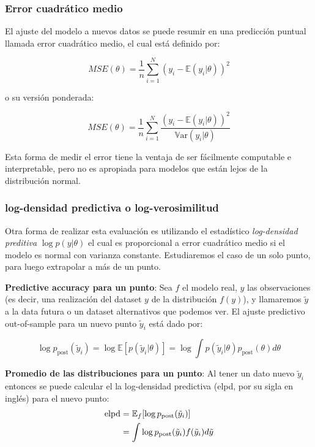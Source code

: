 \subsubsection{Error cuadrático medio}

El ajuste del modelo a nuevos datos se puede resumir en una predicción puntual llamada error cuadrático medio, el cual está definido por:

\begin{equation}
MSE(\theta) = \frac{1}{n}\sum_{i=1}^N (y_i-\mathbb{E}(y_i|\theta))^2
\end{equation}

o su versión ponderada:

\begin{equation}
MSE(\theta) = \frac{1}{n}\sum_{i=1}^N \frac{(y_i-\mathbb{E}(y_i|\theta))^2}{\mathbb{V}\text{ar}(y_i|\theta)}
\end{equation}

Esta forma de medir el error tiene la ventaja de ser fácilmente computable e interpretable, pero no es apropiada para modelos que están lejos de la distribución normal.

\subsubsection{log-densidad predictiva o log-verosimilitud}
Otra forma de realizar esta evaluación es utilizando el estadístico \emph{log-densidad preditiva} $\log p(y|\theta)$ el cual es proporcional a error cuadrático medio si el modelo es normal con varianza constante. Estudiaremos el caso de un solo punto, para luego extrapolar a más de un punto.

\textbf{Predictive accuracy para un punto}: Sea $f$ el modelo real, $y$ las observaciones (es decir, una realización del dataset $y$ de la distribución $f(y)$), y llamaremos $\tilde{y}$ a la data futura o un dataset alternativos que podemos ver. El ajuste predictivo out-of-sample para un nuevo punto $\tilde{y}_i$ está dado por:

\begin{equation}
\log p_{\text{post}}(\tilde{y}_i) = \log \mathbb{E}[p(\tilde{y}_i|\theta)] = \log \int p(\tilde{y}_i|\theta)p_{\text{post}}(\theta)d\theta
\end{equation}

\textbf{Promedio de las distribuciones para un punto}: Al tener un dato nuevo $\tilde{y}_i$ entonces se puede calcular el la log-densidad predictiva (elpd, por su sigla en inglés) para el nuevo punto:
\begin{align}
\notag \text{elpd} & = \mathbb{E}_f[\log p_{\text{post}}(\tilde{y}_i)]\\
& = \int \log p_{\text{post}}(\tilde{y}_i) f(\tilde{y}_i)d\tilde{y}
\end{align}

